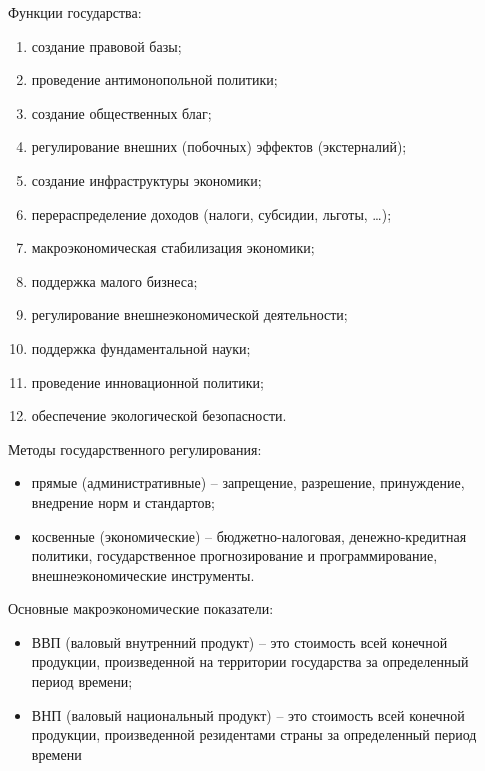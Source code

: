 Функции государства:
\begin{enumerate}
    \item создание правовой базы;
    \item проведение антимонопольной политики;
    \item создание общественных благ;
    \item регулирование внешних (побочных) эффектов (экстерналий);
    \item создание инфраструктуры экономики;
    \item перераспределение доходов (налоги, субсидии, льготы, \ldots);
    \item макроэкономическая стабилизация экономики;
    \item поддержка малого бизнеса;
    \item регулирование внешнеэкономической деятельности;
    \item поддержка фундаментальной науки;
    \item проведение инновационной политики;
    \item обеспечение экологической безопасности.
\end{enumerate}

Методы государственного регулирования:
\begin{itemize}
    \item прямые (административные) -- запрещение, разрешение, принуждение,
    внедрение норм и стандартов;
    \item косвенные (экономические) -- бюджетно-налоговая, денежно-кредитная
    политики, государственное прогнозирование и программирование,
    внешнеэкономические инструменты.
\end{itemize}

Основные макроэкономические показатели:
\begin{itemize}
    \item ВВП (валовый внутренний продукт) -- это стоимость всей конечной
    продукции, произведенной на территории государства за определенный период
    времени;
    \item ВНП (валовый национальный продукт) -- это стоимость всей конечной
    продукции, произведенной резидентами страны за определенный период времени
\end{itemize}

